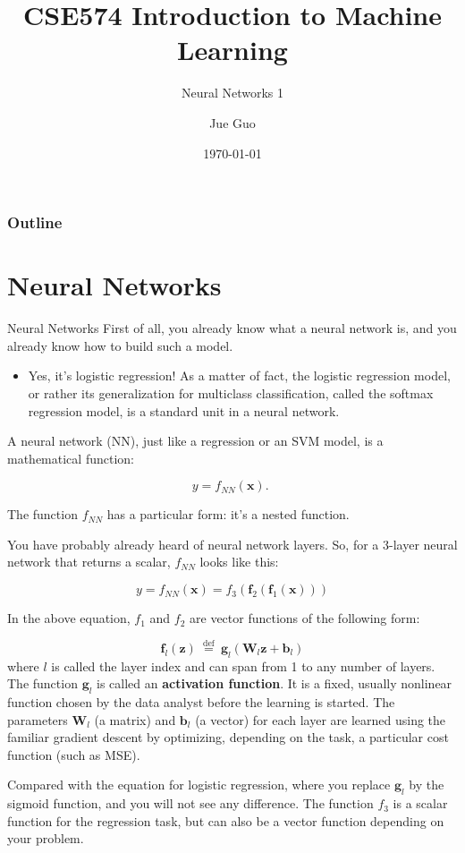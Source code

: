 \documentclass[8pt,dvipsnames]{beamer}
\title{CSE574 Introduction to Machine Learning}
\subtitle{Neural Networks 1}
\author{Jue Guo}
\institute{University at Buffalo}
\date{\today}
\begin{document}
\begin{frame}
	\titlepage
\end{frame}
\begin{frame}
	\frametitle{Outline}
	\tableofcontents
\end{frame}

\section{Neural Networks}
\begin{frame}{Neural Networks}
	First of all, you already know what a neural network is, and you already know how to build such a model.
	\begin{itemize}
		\item Yes, it's logistic regression! As a matter of fact, the logistic regression model, or rather its generalization for multiclass classification, called the softmax regression model, is a standard unit in a neural network.
	\end{itemize}
	A neural network (NN), just like a regression or an SVM model, is a mathematical function:

	$$
		y=f_{N N}(\mathbf{x}) \text {. }
	$$

	The function $f_{N N}$ has a particular form: it's a nested function.
\end{frame}

\begin{frame}
	You have probably already heard of neural network layers. So, for a 3-layer neural network that returns a scalar, $f_{N N}$ looks like this:

	$$
		y=f_{N N}(\mathbf{x})=f_{3}\left(\boldsymbol{f}_{2}\left(\boldsymbol{f}_{1}(\mathbf{x})\right)\right)
	$$

	In the above equation, $f_{1}$ and $f_{2}$ are vector functions of the following form:

	$$
		\boldsymbol{f}_{l}(\mathbf{z}) \stackrel{\text { def }}{=} \boldsymbol{g}_{l}\left(\mathbf{W}_{l} \mathbf{z}+\mathbf{b}_{l}\right)
	$$
	where $l$ is called the layer index and can span from 1 to any number of layers. The function $\boldsymbol{g}_{l}$ is called an \textbf{activation function}. It is a fixed, usually nonlinear function chosen by the data analyst before the learning is started. The parameters $\mathbf{W}_{l}$ (a matrix) and $\mathbf{b}_{l}$ (a vector) for each layer are learned using the familiar gradient descent by optimizing, depending on the task, a particular cost function (such as MSE).

	Compared with the equation for logistic regression, where you replace $\boldsymbol{g}_{l}$ by the sigmoid function, and you will not see any difference. The function $f_{3}$ is a scalar function for the regression task, but can also be a vector function depending on your problem.
\end{frame}
\end{document}
